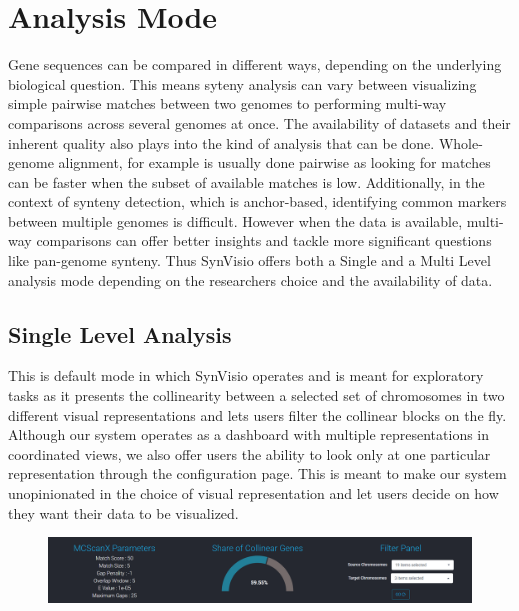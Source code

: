 \section{Analysis Mode}
Gene sequences can be compared in different ways, depending on the underlying biological question. This means syteny analysis can vary between visualizing simple pairwise matches between two genomes to performing  multi-way comparisons across several genomes at once. The availability of datasets and their inherent quality also plays into the kind of analysis that can be done. Whole-genome alignment, for example is usually done pairwise as looking for matches can be faster when the subset of available matches is low. Additionally, in the context of synteny detection, which is anchor-based, identifying common markers between multiple genomes is difficult\cite{wang2012mcscanx}. However when the data is available, multi-way comparisons can offer better insights and tackle more significant questions like pan-genome synteny. Thus SynVisio offers both a Single and a Multi Level analysis mode depending on the researchers choice and the availability of data.

\subsection{Single Level Analysis}
This is default mode in which SynVisio operates and is meant for exploratory tasks as it presents the collinearity between a selected set of chromosomes in two different visual representations and lets users filter the collinear blocks on the fly. Although our system operates as a dashboard with multiple representations in coordinated views, we also offer users the ability to look only at one particular representation through the configuration page. This is meant to make our system unopinionated in the choice of visual representation and let users decide on how they want their data to be visualized. 

\begin{figure}
  \centering
  \includegraphics[width=1\linewidth]{images/ch_5_baseparameters.PNG}
  \label{fig:ch_5_baseparameters}
\end{figure}


